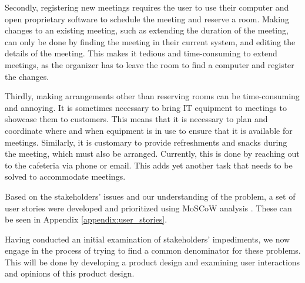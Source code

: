 Secondly, registering new meetings requires the user to use their computer and open proprietary software to schedule the meeting and reserve a room.
Making changes to an existing meeting, such as extending the duration of the meeting, can only be done by finding the meeting in their current system, and editing the details of the meeting.
This makes it tedious and time-consuming to extend meetings, as the organizer has to leave the room to find a computer and register the changes.

Thirdly, making arrangements other than reserving rooms can be time-consuming and annoying. 
It is sometimes necessary to bring IT equipment to meetings to showcase them to customers.
This means that it is necessary to plan and coordinate where and when equipment is in use to ensure that it is available for meetings. 
Similarly, it is customary to provide refreshments and snacks during the meeting, which must also be arranged. 
Currently, this is done by reaching out to the cafeteria via phone or email.
This adds yet another task that needs to be solved to accommodate meetings.

Based on the stakeholders' issues and our understanding of the problem, a set of user stories were developed and prioritized using MoSCoW analysis \cite{DEBbook}.
These can be seen in Appendix \ref{appendix:user_stories}.

Having conducted an initial examination of stakeholders' impediments, we now engage in the process of trying to find a common denominator for these problems.
This will be done by developing a product design and examining user interactions and opinions of this product design.